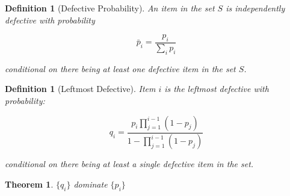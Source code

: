\documentclass[11pt]{article}
\newtheorem{thm}{Theorem}[section]
\newtheorem{definition}{Definition}[section]
\theoremstyle{plain}
\newtheorem{definition}[theorem]{Definition}
\begin{document}
\begin{definition}[Defective Probability]
An item in the set \(S\) is independently defective with probability

\begin{equation}
\bar{p}_i = \frac{p_i}{\sum_i p_i}
\end{equation}

conditional on there being at least one defective item in the set \(S\).
\end{definition}

\begin{definition}[Leftmost Defective]
Item \(i\) is the leftmost defective with probability:

\begin{equation}
q_i = \frac{p_i \prod_{j=1}^{i-1}\left(1-p_j\right)}{1 - \prod_{j=1}^{i-1}\left(1-p_j\right)}
\end{equation}

conditional on there being at least a single defective item in the set.
\end{definition}

\begin{thm}
\(\{q_i\}\) dominate \(\{p_i\}\)
\end{thm}
\end{document}
